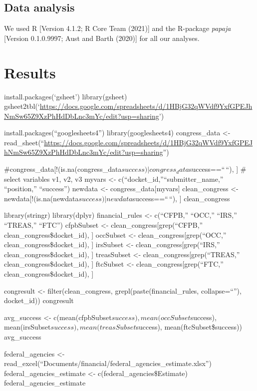 \documentclass[
  english,
  man]{apa6}
\begin{document}
\hypertarget{data-analysis}{%
\subsection{Data analysis}\label{data-analysis}}

We used R {[}Version 4.1.2; R Core Team (2021){]} and the R-package \emph{papaja} {[}Version 0.1.0.9997; Aust and Barth (2020){]} for all our analyses.

\hypertarget{results}{%
\section{Results}\label{results}}

install.packages(`gsheet')
library(gsheet)
gsheet2tbl(`\url{https://docs.google.com/spreadsheets/d/1HBjG32qWVdf9YxfGPEJhNmSw65Z9XzPhHdDbLnc3mYc/edit?usp=sharing}')

install.packages(``googlesheets4'')
library(googlesheets4)
congress\_data \textless- read\_sheet(``\url{https://docs.google.com/spreadsheets/d/1HBjG32qWVdf9YxfGPEJhNmSw65Z9XzPhHdDbLnc3mYc/edit?usp=sharing}'')

\#congress\_data{[}!(is.na(congress\_data\(success) | congress_data\)success==``\,``), {]}
\# select variables v1, v2, v3
myvars \textless- c(``docket\_id,''``submitter\_name,'' ``position,'' ``success'')
newdata \textless- congress\_data{[}myvars{]}
clean\_congress \textless- newdata{[}!(is.na(newdata\(success) | newdata\)success==``\,``), {]}
clean\_congress

library(stringr)
library(dplyr)
financial\_rules \textless- c(``CFPB,'' ``OCC,'' ``IRS,'' ``TREAS,'' ``FTC'')
cfpbSubset \textless- clean\_congress{[}grep(``CFPB,'' clean\_congress\$docket\_id), {]}
occSubset \textless- clean\_congress{[}grep(``OCC,'' clean\_congress\$docket\_id), {]}
irsSubset \textless- clean\_congress{[}grep(``IRS,'' clean\_congress\$docket\_id), {]}
treasSubset \textless- clean\_congress{[}grep(``TREAS,'' clean\_congress\$docket\_id), {]}
ftcSubset \textless- clean\_congress{[}grep(``FTC,'' clean\_congress\$docket\_id), {]}

congresult \textless- filter(clean\_congress, grepl(paste(financial\_rules, collapse=``\textbar{}''), docket\_id))
congresult

avg\_success \textless- c(mean(cfpbSubset\(success), mean(occSubset\)success), mean(irsSubset\(success), mean(treasSubset\)success), mean(ftcSubset\$success))
avg\_success

federal\_agencies \textless- read\_excel(``Documents/financial/federal\_agencies\_estimate.xlsx'')
federal\_agencies\_estimate \textless- c(federal\_agencies\$Estimate)
federal\_agencies\_estimate
\end{document}
